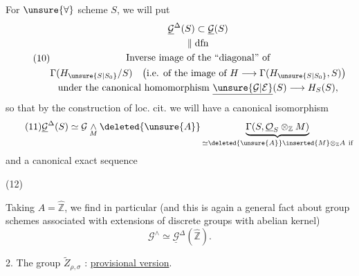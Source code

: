 For $\unsure{\forall}$ scheme $S$, we will put
\[
\tag{10}
\begin{gathered}
\underline{\mathcal G}^{\Delta}(S)\subset\underline{\mathcal G}(S)\\
\Vert\;\mathrm{dfn}\\
\text{Inverse image of the ``diagonal'' of}\\
\Gamma(H_{\unsure{S|S_0}}/S)
\quad\bigl(\text{i.e. of the image of }H\longrightarrow\Gamma(H_{\unsure{S|S_0}},S)\bigr)\\
\text{under the canonical homomorphism }\underline{\unsure{\mathcal G|\mathcal E}}(S)\longrightarrow H_S(S),
\end{gathered}
\]
so that by the construction of loc. cit. we will have a canonical isomorphism
\[
\tag{11}
\underline{\mathcal G}^{\Delta}(S)\simeq
\mathcal G\underset{M}{\wedge}\deleted{\unsure{A}}
\underbrace{\Gamma(S,\underline{\mathcal O}_S\otimes_{\mathbb Z}M)}_{
\simeq\deleted{\unsure{A}}\inserted{M}\otimes_{\mathbb Z}A\ \text{if}}
\]
and a canonical exact sequence

\begin{samepage}
(12)\quad{}
\end{samepage}


Taking $A=\widehat{\mathbb Z}$, we find in particular (and this is again a general fact about group schemes associated with extensions of discrete groups with abelian kernel)
\[
\tag{13}
\mathcal G^{\wedge}\simeq\underline{\mathcal G}^{\Delta}(\widehat{\mathbb Z}).
\]


2. The group $\widetilde Z_{\rho,\sigma}$ : \uline{provisional version}.

